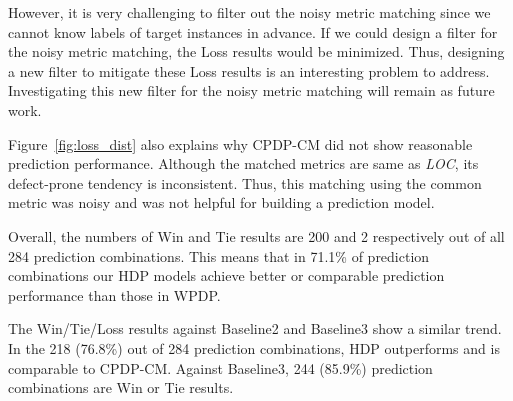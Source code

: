 However, it is very challenging to filter out the noisy metric matching since we
cannot know labels of target instances in
advance. If we could design a filter for the noisy metric matching, the Loss
results would be minimized. Thus, designing a new filter to mitigate these Loss
results is an interesting problem to address. Investigating this new filter
for the noisy metric matching will remain as future work.

Figure~\ref{fig:loss_dist} also explains why CPDP-CM did not show reasonable
prediction performance. Although the matched metrics are same
as {\em LOC}, its defect-prone tendency is inconsistent. Thus, this matching using
the common metric was noisy and was not helpful for building a prediction model.







Overall, the numbers of Win and
Tie results are 200 and 2 respectively out of all 284 prediction
combinations.
This means that in 71.1\% of prediction combinations our HDP
models achieve better or comparable prediction performance than those in
WPDP.

The Win/Tie/Loss results against Baseline2 and Baseline3 show a similar trend.
In the 218 (76.8\%) out of 284 prediction combinations, HDP outperforms and is comparable to CPDP-CM. Against Baseline3, 244
(85.9\%) prediction combinations are Win or Tie results.



